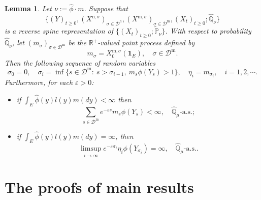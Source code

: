 \documentclass[12pt,a4paper]{amsart}
\numberwithin{equation}{section}
\theoremstyle{plain}
\newtheorem{lem}[thm]{Lemma}
\theoremstyle{definition}
\begin{document}
\begin{lem}\label{lem:import_lemma}
Let $\nu := \widehat \phi \cdot m$.
Suppose that
\[\{(Y)_{t\geq 0}, (X^{\mathrm n, \sigma})_{\sigma\in \mathcal D^\mathrm n}, (X^{\mathrm m, \sigma})_{\sigma \in \mathcal D^\mathrm m}, (X_t)_{t\geq 0}; \widehat{\mathbb Q}_{\nu}\}\]
is a reverse spine representation of $\{(X_t)_{t\geq 0}; \widetilde {\mathbb P}_\nu\}$.
With respect to probability $\widehat{\mathbb Q}_\nu$, let $(m_\sigma)_{\sigma\in \mathcal D^{\mathrm m}}$ be the $\mathbb R^+$-valued point process defined by
  \[
    m_\sigma
    = X^{\mathrm m, \sigma}_0(\mathbf 1_E),
    \quad \sigma \in \mathcal D^{\mathrm m}.
  \]
Then the following sequence of random variables
  \[
    \sigma_0=0,\quad \sigma_i=\inf\{s\in\mathcal D^{\mathrm m}:\ s>\sigma_{i-1},\ m_s\phi(Y_s)>1\}, \quad\eta_i=m_{\sigma_i},\quad i=1,2,\cdots.
  \]
  Furthermore, for each $\varepsilon>0$:
  \begin{itemize}
  \item
    if $\int_E\widehat{\phi}(y)l(y)m(dy)<\infty$ then
  \[
    \sum_{s\in\mathcal D^{\mathrm m}} e^{-\varepsilon s}m_s\phi(Y_s)
    < \infty,
    \quad \widehat{\mathbb Q}_{\mu}\text{-a.s.};
  \]
\item
  if $ \int_E\widehat{\phi}(y)l(y)m(dy)=\infty$, then
  \[
    \limsup_{i\rightarrow\infty} e^{-\varepsilon\sigma_i}\eta_i \phi(Y_{\sigma_i})
    =\infty,
    \quad \widehat{\mathbb Q}_{\mu}\text{-a.s.}.
  \]
\end{itemize}
\end{lem}

\section{The proofs of main results}
\end{document}
